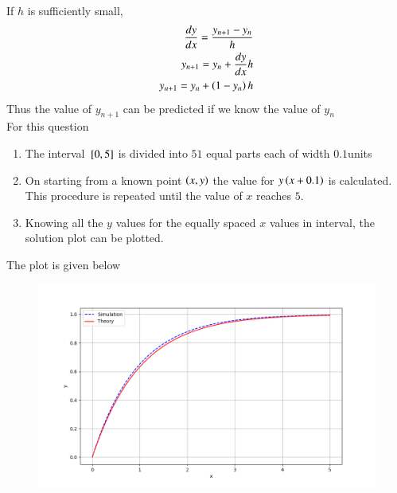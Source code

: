 \documentclass[journal,12pt,onecolumn]{IEEEtran}
\theoremstyle{remark}
\begin{document}
If $h$ is sufficiently small,\\
\begin{align*}
  \frac{dy}{dx}=\frac{{}y_{n+1}-y_{n}}{h}\\
  y_{n+1}=y_{n}+\frac{dy}{dx}h\\
  y_{n+1}=y_{n}+\left(1-y_{n}\right)h\\
\end{align*}
Thus the value of $y_{n+1}$ can be predicted if we know the value of $y_{n}$\\
For this question 
\begin{enumerate}
    \item The interval ${}\left[0,5\right]$ is divided  into $51$ equal parts each of width $0.1$units
    \item On starting from a known point $\left(x,y\right)$ the value for $y\left(x+0.1\right)$ is calculated. This procedure is repeated until the value of $x$ reaches $5$.
    \item Knowing all the $y$ values for the equally spaced $x$ values in interval, the solution plot can be plotted.
\end{enumerate}
\newpage
The plot is given below\\
\begin{figure}[h!]
    \centering
    \includegraphics[width=0.7\columnwidth]{figs/Q1.png}
    \label{stemplot}
\end{figure}
\end{document}
